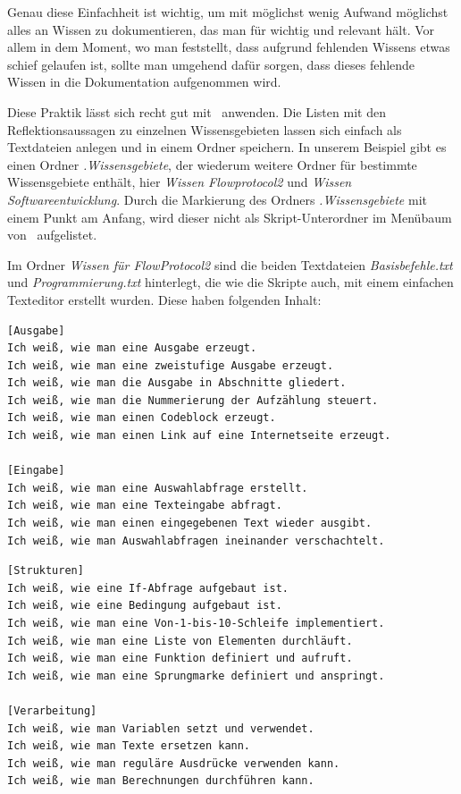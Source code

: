 Genau diese Einfachheit ist wichtig, um mit möglichst wenig Aufwand möglichst alles an Wissen zu dokumentieren, das man für wichtig und relevant hält. Vor allem in dem Moment, wo man feststellt, dass aufgrund fehlenden Wissens etwas schief gelaufen ist, sollte man umgehend dafür sorgen, dass dieses fehlende Wissen in die Dokumentation aufgenommen wird.

Diese Praktik lässt sich recht gut mit \FPZ\ anwenden. Die Listen mit den Reflektionsaussagen zu einzelnen Wissensgebieten lassen sich einfach als Textdateien anlegen und in einem Ordner speichern. In unserem Beispiel gibt es einen Ordner \emph{.Wissensgebiete}, der wiederum weitere Ordner für bestimmte Wissensgebiete enthält, hier \emph{Wissen Flowprotocol2} und \emph{Wissen Softwareentwicklung}. Durch die Markierung des Ordners \emph{.Wissensgebiete} mit einem Punkt am Anfang, wird dieser nicht als Skript-Unterordner im Menübaum von \FPZ\ aufgelistet.

Im Ordner \emph{Wissen für FlowProtocol2} sind die beiden Textdateien \emph{Basisbefehle.txt} und \emph{Programmierung.txt} hinterlegt, die wie die Skripte auch, mit einem einfachen Texteditor erstellt wurden. Diese haben folgenden Inhalt:

\label{BspBasisbefehle}
\begin{verbatim}
[Ausgabe]
Ich weiß, wie man eine Ausgabe erzeugt.
Ich weiß, wie man eine zweistufige Ausgabe erzeugt.
Ich weiß, wie man die Ausgabe in Abschnitte gliedert.
Ich weiß, wie man die Nummerierung der Aufzählung steuert.
Ich weiß, wie man einen Codeblock erzeugt.
Ich weiß, wie man einen Link auf eine Internetseite erzeugt.

[Eingabe]
Ich weiß, wie man eine Auswahlabfrage erstellt.
Ich weiß, wie man eine Texteingabe abfragt.
Ich weiß, wie man einen eingegebenen Text wieder ausgibt.
Ich weiß, wie man Auswahlabfragen ineinander verschachtelt.
\end{verbatim}

\label{BspProgrammierung}
\begin{verbatim}
[Strukturen]
Ich weiß, wie eine If-Abfrage aufgebaut ist. 
Ich weiß, wie eine Bedingung aufgebaut ist.
Ich weiß, wie man eine Von-1-bis-10-Schleife implementiert.
Ich weiß, wie man eine Liste von Elementen durchläuft.
Ich weiß, wie man eine Funktion definiert und aufruft.
Ich weiß, wie man eine Sprungmarke definiert und anspringt.

[Verarbeitung]
Ich weiß, wie man Variablen setzt und verwendet.
Ich weiß, wie man Texte ersetzen kann.
Ich weiß, wie man reguläre Ausdrücke verwenden kann.
Ich weiß, wie man Berechnungen durchführen kann.
\end{verbatim}

